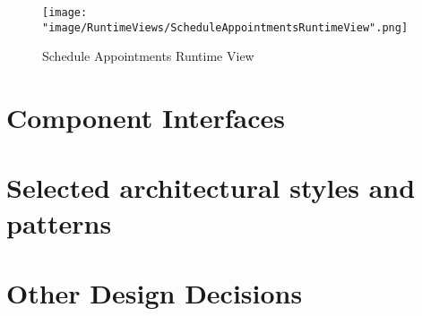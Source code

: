 \begin{figure}[H]
\begin{center}
\texttt{[image: "image/RuntimeViews/ScheduleAppointmentsRuntimeView".png]}
\caption{Schedule Appointments Runtime View}
\end{center}
\end{figure}

\section{Component Interfaces}

\section{Selected architectural styles and patterns}

\section{Other Design Decisions}